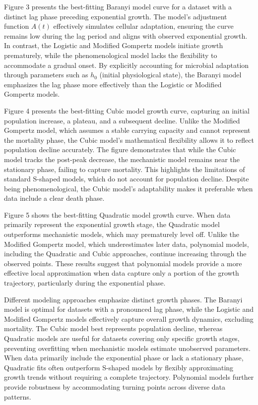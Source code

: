 \documentclass{article}
\begin{document}
Figure 3 presents the best-fitting Baranyi model curve for a dataset with a distinct lag phase preceding exponential growth. The model's adjustment function $A(t)$ effectively simulates cellular adaptation, ensuring the curve remains low during the lag period and aligns with observed exponential growth. In contrast, the Logistic and Modified Gompertz models initiate growth prematurely, while the phenomenological model lacks the flexibility to accommodate a gradual onset. By explicitly accounting for microbial adaptation through parameters such as $h_0$ (initial physiological state), the Baranyi model emphasizes the lag phase more effectively than the Logistic or Modified Gompertz models.

Figure 4 presents the best-fitting Cubic model growth curve, capturing an initial population increase, a plateau, and a subsequent decline. Unlike the Modified Gompertz model, which assumes a stable carrying capacity and cannot represent the mortality phase, the Cubic model’s mathematical flexibility allows it to reflect population decline accurately. The figure demonstrates that while the Cubic model tracks the post-peak decrease, the mechanistic model remains near the stationary phase, failing to capture mortality. This highlights the limitations of standard S-shaped models, which do not account for population decline. Despite being phenomenological, the Cubic model’s adaptability makes it preferable when data include a clear death phase.



Figure 5 shows the best-fitting Quadratic model growth curve. When data primarily represent the exponential growth stage, the Quadratic model outperforms mechanistic models, which may prematurely level off. Unlike the Modified Gompertz model, which underestimates later data, polynomial models, including the Quadratic and Cubic approaches, continue increasing through the observed points. These results suggest that polynomial models provide a more effective local approximation when data capture only a portion of the growth trajectory, particularly during the exponential phase.


Different modeling approaches emphasize distinct growth phases. The Baranyi model is optimal for datasets with a pronounced lag phase, while the Logistic and Modified Gompertz models effectively capture overall growth dynamics, excluding mortality. The Cubic model best represents population decline, whereas Quadratic models are useful for datasets covering only specific growth stages, preventing overfitting when mechanistic models estimate unobserved parameters. When data primarily include the exponential phase or lack a stationary phase, Quadratic fits often outperform S-shaped models by flexibly approximating growth trends without requiring a complete trajectory. Polynomial models further provide robustness by accommodating turning points across diverse data patterns.
\end{document}

